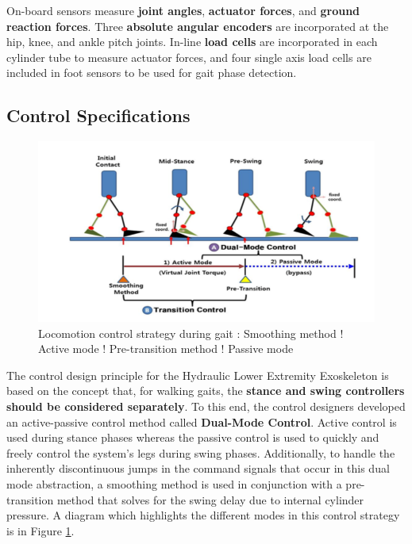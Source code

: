 \begin{refsection}
 On-board sensors measure \textbf{joint angles}, \textbf{actuator forces}, and \textbf{ground reaction forces}.  Three \textbf{absolute angular encoders} are incorporated at the hip, knee, and ankle pitch joints.  In-line \textbf{load cells} are incorporated in each cylinder tube to measure actuator forces, and four single axis load cells are included in foot sensors to be used for gait phase detection.
 
 \subsection{Control Specifications}
 
 \begin{figure}[thpb]
\centering
\includegraphics[width=5.in]{exos/figs/hydLowerExrem/dualModeDia}
  \caption{Locomotion control strategy during gait : Smoothing method $!$ Active mode $!$ Pre-transition method $!$ Passive mode}
 \label{fig:dualModeDia}   
 \end{figure}
The control design principle for the Hydraulic Lower Extremity Exoskeleton is based on the concept that, for walking gaits, the {\bf stance and swing controllers should be considered separately}.  To this end, the control designers developed an active-passive control method called {\bf Dual-Mode Control}.  Active control is used during stance phases whereas the passive control is used to quickly and freely control the system's legs during swing phases.  Additionally, to handle the inherently discontinuous jumps in the command signals that occur in this dual mode abstraction, a smoothing method is used in conjunction with a pre-transition method that solves for the swing delay due to internal cylinder pressure.  A diagram which highlights the different modes in this control strategy is in Figure \ref{fig:dualModeDia}.   


\end{refsection}
